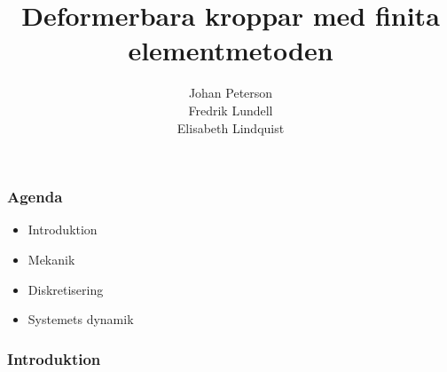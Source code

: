 \documentclass{beamer}
\title{Deformerbara kroppar med finita elementmetoden}
\author{Johan Peterson\\Fredrik Lundell\\Elisabeth Lindquist}
\begin{document}
\begin{frame}
\maketitle
\end{frame}

\begin{frame}
\frametitle{Agenda}
\begin{itemize}
\item Introduktion
\item Mekanik
\item Diskretisering
\item Systemets dynamik
\end{itemize}

\end{frame}


\begin{frame}
\frametitle{Introduktion}


\end{frame}
\end{document}
